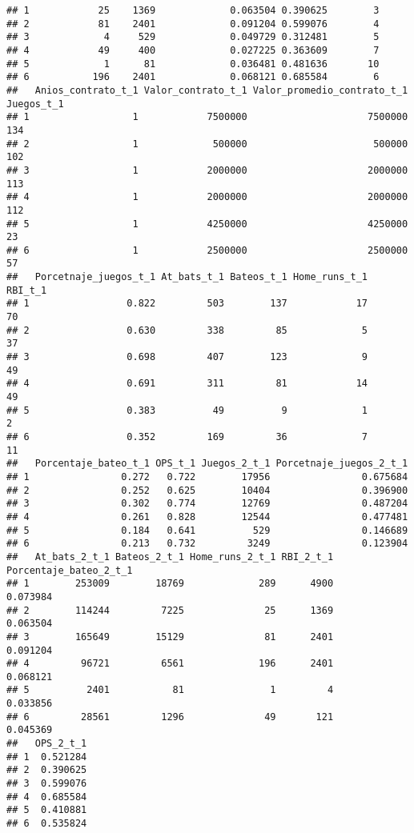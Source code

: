 \documentclass[
]{article}
\begin{document}
\begin{verbatim}
## 1            25    1369             0.063504 0.390625        3
## 2            81    2401             0.091204 0.599076        4
## 3             4     529             0.049729 0.312481        5
## 4            49     400             0.027225 0.363609        7
## 5             1      81             0.036481 0.481636       10
## 6           196    2401             0.068121 0.685584        6
##   Anios_contrato_t_1 Valor_contrato_t_1 Valor_promedio_contrato_t_1 Juegos_t_1
## 1                  1            7500000                     7500000        134
## 2                  1             500000                      500000        102
## 3                  1            2000000                     2000000        113
## 4                  1            2000000                     2000000        112
## 5                  1            4250000                     4250000         23
## 6                  1            2500000                     2500000         57
##   Porcetnaje_juegos_t_1 At_bats_t_1 Bateos_t_1 Home_runs_t_1 RBI_t_1
## 1                 0.822         503        137            17      70
## 2                 0.630         338         85             5      37
## 3                 0.698         407        123             9      49
## 4                 0.691         311         81            14      49
## 5                 0.383          49          9             1       2
## 6                 0.352         169         36             7      11
##   Porcentaje_bateo_t_1 OPS_t_1 Juegos_2_t_1 Porcetnaje_juegos_2_t_1
## 1                0.272   0.722        17956                0.675684
## 2                0.252   0.625        10404                0.396900
## 3                0.302   0.774        12769                0.487204
## 4                0.261   0.828        12544                0.477481
## 5                0.184   0.641          529                0.146689
## 6                0.213   0.732         3249                0.123904
##   At_bats_2_t_1 Bateos_2_t_1 Home_runs_2_t_1 RBI_2_t_1 Porcentaje_bateo_2_t_1
## 1        253009        18769             289      4900               0.073984
## 2        114244         7225              25      1369               0.063504
## 3        165649        15129              81      2401               0.091204
## 4         96721         6561             196      2401               0.068121
## 5          2401           81               1         4               0.033856
## 6         28561         1296              49       121               0.045369
##   OPS_2_t_1
## 1  0.521284
## 2  0.390625
## 3  0.599076
## 4  0.685584
## 5  0.410881
## 6  0.535824
\end{verbatim}
\end{document}
